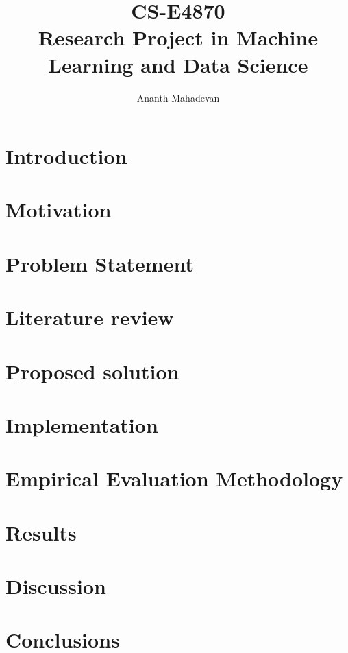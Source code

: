 \documentclass[a4papesigconfr,11pt]{article}
\title{CS-E4870 \\
        \large Research Project in Machine Learning and Data Science}
\author{Ananth Mahadevan}
\begin{document}
\maketitle

\begin{abstract}
    \label{sec:abstract}
    
\end{abstract}

\section{Introduction}
\label{sec:introduction}


\section{Motivation}
\label{sec:motivation}


\section{Problem Statement}
\label{sec:problem-statement}

\section{Literature review}
\label{sec:literature-review}

\section{Proposed solution}
\label{sec:solution}

\section{Implementation}
\label{sec:implementation}

\section{Empirical Evaluation Methodology}
\label{sec:evaluation}

\section{Results}
\label{sec:results}


\section{Discussion}
\label{sec:discussion}


\section{Conclusions}
\label{sec:conclusion}
\end{document}

